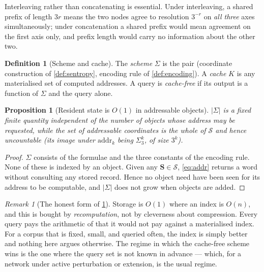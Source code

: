 \documentclass[11pt,twocolumn,a4paper]{article}
\theoremstyle{plain}
\newtheorem{proposition}[theorem]{Proposition}
\theoremstyle{definition}
\newtheorem{definition}[theorem]{Definition}
\theoremstyle{remark}
\newtheorem{remark}[theorem]{Remark}
\newcommand{\Sspace}{\mathcal{S}}
\newcommand{\Scoord}{\mathbf{S}}
\newcommand{\addr}{\mathrm{addr}}
\newcommand{\Trits}{\Sigma_3}
\begin{document}
Interleaving rather than concatenating is essential. Under interleaving, a
shared prefix of length $3r$ means the two nodes agree to resolution $3^{-r}$ on
\emph{all three} axes simultaneously; under concatenation a shared prefix would
mean agreement on the first axis only, and prefix length would carry no
information about the other two.

\begin{definition}[Scheme and cache]
\label{def:scheme-cache}
The \emph{scheme} $\Sigma$ is the pair (coordinate construction of
\cref{def:sentropy}, encoding rule of \cref{def:encoding}). A \emph{cache}
$K$ is any materialised set of computed addresses. A query is
\emph{cache-free} if its output is a function of $\Sigma$ and the query alone.
\end{definition}

\begin{proposition}[Resident state is $O(1)$ in addressable objects]
\label{prop:resident}
$|\Sigma|$ is a fixed finite quantity independent of the number of objects
whose address may be requested, while the set of addressable coordinates is the
whole of $\Sspace$ and hence uncountable (its image under $\addr_k$ being
$\Trits^k$, of size $3^k$).
\end{proposition}

\begin{proof}
$\Sigma$ consists of the formulae  and the three
constants of the encoding rule. None of these is indexed by an object. Given
any $\Scoord \in \Sspace$, \cref{eq:addr} returns a word without consulting any
stored record. Hence no object need have been seen for its address to be
computable, and $|\Sigma|$ does not grow when objects are added.
\end{proof}

\begin{remark}[The honest form of \cref{prop:resident}]
\label{rem:honest}
Storage is $O(1)$ where an index is $O(n)$, and this is bought by
\emph{recomputation}, not by cleverness about compression. Every query pays the
arithmetic of  that it would not pay against a
materialised index. For a corpus that is fixed, small, and queried often, the
index is simply better and nothing here argues otherwise. The regime in which
the cache-free scheme wins is the one where the query set is not known in
advance --- which, for a network under active perturbation or extension, is the
usual regime.
\end{remark}
\end{document}
